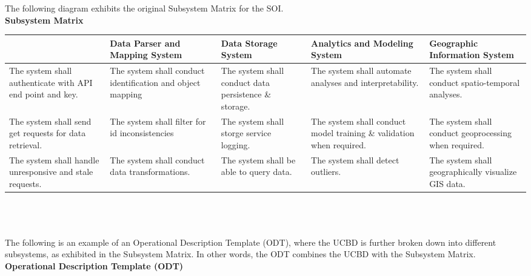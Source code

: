 \documentclass{article}
\begin{document}
\newpage
The following diagram exhibits the original Subsystem Matrix for the SOI.\\

\textbf{Subsystem Matrix}\\

\begin{tabular}{ | m{70pt} | m{70pt}| m{70pt} | m{70pt} | m{70pt} | }    
    \hline
    \textbf{\centering{Data Collection System}} & \textbf{Data Parser and Mapping System} & \textbf{Data Storage System} & \textbf{Analytics and Modeling System} & \textbf{Geographic Information System}\\ 
    \hline
    The system shall authenticate with API end point and key. & The system shall conduct identification and object mapping & The system shall conduct data persistence \& storage. & The system shall automate analyses and interpretability. & The system shall conduct spatio-temporal analyses.\\ 
    \hline
    The system shall send get requests for data retrieval. & The system shall filter for id inconsistencies & The system shall storge service logging. & The system shall conduct model training \& validation when required. & The system shall conduct geoprocessing when required.\\
    \hline
    The system shall handle unresponsive and stale requests. & The system shall conduct data transformations. & The system shall be able to query data. & The system shall detect outliers. & The system shall geographically visualize GIS data.\\
    \hline
\end{tabular}\\

\\~\\
The following is an example of an Operational Description Template (ODT), where the UCBD is further broken down into different subsystems, as exhibited in the Subsystem Matrix. In other words, the ODT combines the UCBD with the Subsystem Matrix.\\

\textbf{Operational Description Template (ODT)}\\
\end{document}

